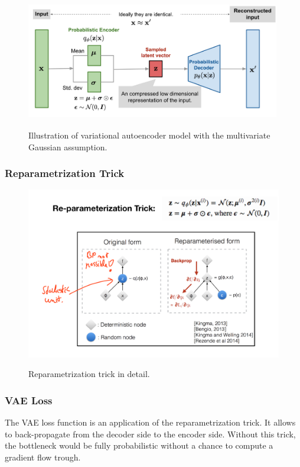 \documentclass[main]{subfiles}
\begin{document}
 \begin{figure}[H]
	\centering
	\includegraphics[width=0.9\linewidth]{07_UnsupervisedAndSelfsupervisedLearning/figures/autoencoder-vae.png}
	\label{fig:wake-sleep}
	\caption{Illustration of variational autoencoder model with the multivariate Gaussian assumption.}
\end{figure}

\subsubsection{Reparametrization Trick}
 \begin{figure}[H]
	\centering
	\includegraphics[width=0.9\linewidth]{07_UnsupervisedAndSelfsupervisedLearning/figures/reparam.png}
	\label{fig:reparam}
	\caption{Reparametrization trick in detail.}
\end{figure}

\subsubsection{VAE Loss}
The VAE loss function is an application of the reparametrization trick. It allows to back-propagate from the decoder side to the encoder side. Without this trick, the bottleneck would be fully probabilistic without a chance to compute a gradient flow trough.
\end{document}
